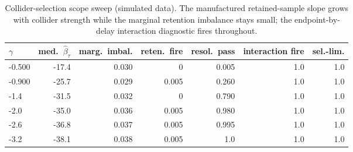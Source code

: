 \begin{table}[t]
\centering
\caption{Collider-selection scope sweep (simulated data). The manufactured retained-sample slope grows with collider strength while the marginal retention imbalance stays small; the endpoint-by-delay interaction diagnostic fires throughout.}
\label{tab:si-collider-sweep}
\footnotesize
\begin{tabular}{lrrrrrr}
\toprule
$\gamma$ & med.\ $\widehat{\beta}_\tau$ & marg.\ imbal. & reten.\ fire & resol.\ pass & interaction fire & sel.-lim. \\
\midrule
-0.500 & -17.4 & 0.030 & 0 & 0.005 & 1.0 & 1.0 \\
-0.900 & -25.7 & 0.029 & 0.005 & 0.260 & 1.0 & 1.0 \\
-1.4 & -31.5 & 0.032 & 0 & 0.790 & 1.0 & 1.0 \\
-2.0 & -35.0 & 0.036 & 0.005 & 0.980 & 1.0 & 1.0 \\
-2.6 & -36.8 & 0.037 & 0.005 & 0.995 & 1.0 & 1.0 \\
-3.2 & -38.1 & 0.038 & 0.005 & 1.0 & 1.0 & 1.0 \\
\bottomrule
\end{tabular}
\end{table}
